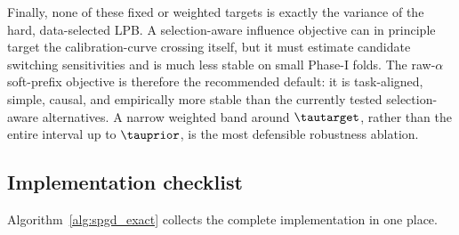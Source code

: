 Finally, none of these fixed or weighted targets is exactly the variance of
the hard, data-selected LPB.  A selection-aware influence objective can in
principle target the calibration-curve crossing itself, but it must estimate
candidate switching sensitivities and is much less stable on small Phase-I
folds.  The raw-$\alpha$ soft-prefix objective is therefore the recommended
default: it is task-aligned, simple, causal, and empirically more stable than
the currently tested selection-aware alternatives.  A narrow weighted band
around $\tautarget$, rather than the entire interval up to $\tauprior$, is the
most defensible robustness ablation.

\subsection{Implementation checklist}

Algorithm~\ref{alg:spgd_exact} collects the complete implementation in one
place.

